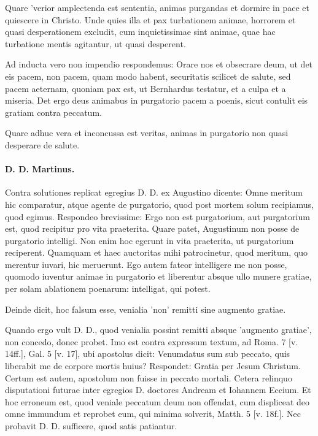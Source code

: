 Quare 'verior amplectenda est sententia, animas purgandas et dormire in pace et quiescere in Christo. Unde quies illa et pax turbationem animae, horrorem et quasi desperationem excludit, cum inquietissimae sint animae, quae hac turbatione mentis agitantur, ut quasi desperent.

Ad inducta vero non impendio respondemus: Orare nos et obsecrare deum, ut det eis pacem, non pacem, quam modo habent, securitatis scilicet de salute, sed pacem aeternam, quoniam pax est, ut Bernhardus testatur, et a culpa et a miseria. Det ergo deus animabus in purgatorio pacem a poenis, sicut contulit eis gratiam contra peccatum.

Quare adhuc vera et inconcussa est veritas, animas in purgatorio non quasi desperare de salute.

\paragraph*{D. D. Martinus.}

Contra solutiones replicat egregius D. D. ex Augustino dicente: Omne meritum hic comparatur, atque agente de purgatorio, quod post mortem solum recipiamus, quod egimus. Respondeo brevissime: Ergo non est purgatorium, aut purgatorium est, quod recipitur pro vita praeterita. Quare patet, Augustinum non posse de purgatorio intelligi. Non enim hoc egerunt in vita praeterita, ut purgatorium reciperent. Quamquam et haec auctoritas mihi patrocinetur, quod meritum, quo merentur iuvari, hic meruerunt. Ego autem fateor intelligere me non posse, quomodo iuventur animae in purgatorio et liberentur absque ullo munere gratiae, per solam ablationem poenarum: intelligat, qui potest.

Deinde dicit, hoc falsum esse, venialia 'non' remitti sine augmento gratiae.

Quando ergo vult D. D., quod venialia possint remitti absque 'augmento gratiae', non concedo, donec probet. Imo est contra expressum textum, ad Roma. 7 [v. 14ff.], Gal. 5 [v. 17], ubi apostolus dicit: Venumdatus sum sub peccato, quis liberabit me de corpore mortis huius? Respondet: Gratia per Jesum \marginpar{\small[339]} Christum. Certum est autem, apostolum non fuisse in peccato mortali. Cetera relinquo disputationi futurae inter egregios D. doctores Andream et Iohannem Eccium. Et hoc erroneum est, quod veniale peccatum deum non offendat, cum displiceat deo omne immundum et reprobet eum, qui minima solverit, Matth. 5 [v. 18f.]. Nec probavit D. D. sufficere, quod satis patiantur.

